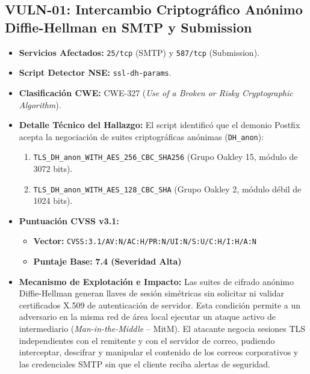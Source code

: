 \subsection{VULN-01: Intercambio Criptográfico Anónimo Diffie-Hellman en SMTP y Submission}

\begin{itemize}
  \item \textbf{Servicios Afectados:} \texttt{25/tcp} (SMTP) y \texttt{587/tcp} (Submission).
  \item \textbf{Script Detector NSE:} \texttt{ssl-dh-params}.
  \item \textbf{Clasificación CWE:} CWE-327 (\textit{Use of a Broken or Risky Cryptographic Algorithm}).
  \item \textbf{Detalle Técnico del Hallazgo:} El script identificó que el demonio Postfix acepta la negociación de suites criptográficas anónimas (\texttt{DH\_anon}):
    \begin{enumerate}
      \item \texttt{TLS\_DH\_anon\_WITH\_AES\_256\_CBC\_SHA256} (Grupo Oakley 15, módulo de 3072 bits).
      \item \texttt{TLS\_DH\_anon\_WITH\_AES\_128\_CBC\_SHA} (Grupo Oakley 2, módulo débil de 1024 bits).
    \end{enumerate}
  \item \textbf{Puntuación CVSS v3.1:}
    \begin{itemize}
      \item \textbf{Vector:} \texttt{CVSS:3.1/AV:N/AC:H/PR:N/UI:N/S:U/C:H/I:H/A:N}
      \item \textbf{Puntaje Base:} \textbf{7.4 (Severidad Alta)}
    \end{itemize}
  \item \textbf{Mecanismo de Explotación e Impacto:} Las suites de cifrado anónimo Diffie-Hellman generan llaves de sesión simétricas sin solicitar ni validar certificados X.509 de autenticación de servidor. Esta condición permite a un adversario en la misma red de área local ejecutar un ataque activo de intermediario (\textit{Man-in-the-Middle} -- MitM). El atacante negocia sesiones TLS independientes con el remitente y con el servidor de correo, pudiendo interceptar, descifrar y manipular el contenido de los correos corporativos y las credenciales SMTP sin que el cliente reciba alertas de seguridad.
\end{itemize}

